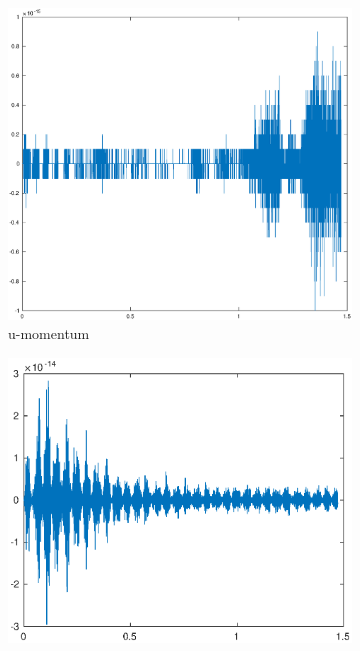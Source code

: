 \begin{figure}[h!]
    \centering
    \begin{subfigure}[b]{0.3\textwidth}
        \centering
        \includegraphics[width=\textwidth]{images/cons_momu.eps}\hfill
        \caption{u-momentum}
        \label{fig:mumu}
    \end{subfigure}
    \hfill
    \begin{subfigure}[b]{0.3\textwidth}
        \centering
        \includegraphics[width=\textwidth]{images/cons_momv.eps}\hfill

\end{subfigure}
\end{figure}
